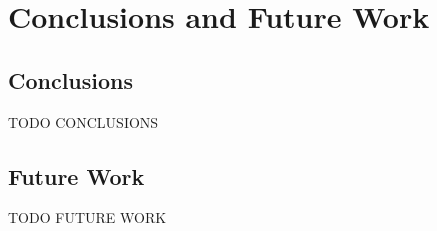 \chapter{Conclusions and Future Work}
\label{chp:conclusionsandfuturework}

\section{Conclusions}
TODO CONCLUSIONS

\section{Future Work}
TODO FUTURE WORK

